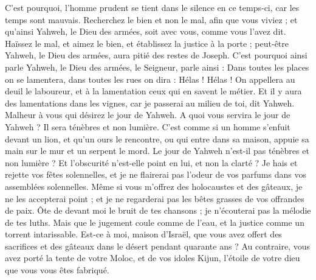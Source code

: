 \begin{multicols}{2}
C'est pourquoi, l'homme prudent se tient dans le silence en ce temps-ci, car les temps sont mauvais.
Recherchez le bien et non le mal, afin que vous viviez ; et qu'ainsi Yahweh, le Dieu des armées, soit avec vous, comme vous l'avez dit.
Haïssez le mal, et aimez le bien, et établissez la justice à la porte ; peut-être Yahweh, le Dieu des armées, aura pitié des restes de Joseph.
C'est pourquoi ainsi parle Yahweh, le Dieu des armées, le Seigneur, parle ainsi : Dans toutes les places on se lamentera, dans toutes les rues on dira : Hélas ! Hélas ! On appellera au deuil le laboureur, et à la lamentation ceux qui en savent le métier.
Et il y aura des lamentations dans les vignes, car je passerai au milieu de toi, dit Yahweh.
Malheur à vous qui désirez le jour de Yahweh. A quoi vous servira le jour de Yahweh ? Il sera ténèbres et non lumière.
C'est comme si un homme s'enfuit devant un lion, et qu'un ours le rencontre, ou qui entre dans sa maison, appuie sa main sur le mur et un serpent le mord.
Le jour de Yahweh n'est-il pas ténèbres et non lumière ? Et l'obscurité n'est-elle point en lui, et non la clarté ?
Je hais et rejette vos fêtes solennelles, et je ne flairerai pas l'odeur de vos parfums dans vos assemblées solennelles.
Même si vous m'offrez des holocaustes et des gâteaux, je ne les accepterai point ; et je ne regarderai pas les bêtes grasses de vos offrandes de paix.
Ôte de devant moi le bruit de tes chansons ; je n'écouterai pas la mélodie de tes luths.
Mais que le jugement coule comme de l'eau, et la justice comme un torrent intarissable.
Est-ce à moi, maison d'Israël, que vous avez offert des sacrifices et des gâteaux dans le désert pendant quarante ans ?
Au contraire, vous avez porté la tente de votre Moloc, et de vos idoles Kijun, l'étoile de votre dieu que vous vous êtes fabriqué.

\end{multicols}
